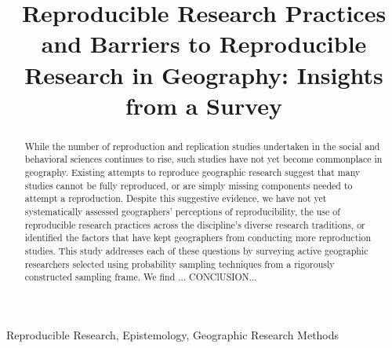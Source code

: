 \documentclass[]{interact}
\theoremstyle{plain}%
\theoremstyle{definition}
\theoremstyle{remark}
\begin{document}

\title{Reproducible Research Practices and Barriers to Reproducible Research in Geography: Insights from a Survey}

\author{
}

\maketitle

\begin{abstract}
While the number of reproduction and replication studies undertaken in the social and behavioral sciences continues to rise, such studies have not yet become commonplace in geography. 
Existing attempts to reproduce geographic research suggest that many studies cannot be fully reproduced, or are simply missing components needed to attempt a reproduction. 
Despite this suggestive evidence, we have not yet systematically assessed geographers' perceptions of reproducibility, the use of reproducible research practices across the discipline's diverse research traditions, or identified the factors that have kept geographers from conducting more reproduction studies.
This study addresses each of these questions by surveying active geographic researchers selected using probability sampling techniques from a rigorously constructed sampling frame.
We find ...
CONClUSION...

\end{abstract}

\begin{keywords}
Reproducible Research, Epistemology, Geographic Research Methods
\end{keywords}

\newpage
\end{document}
